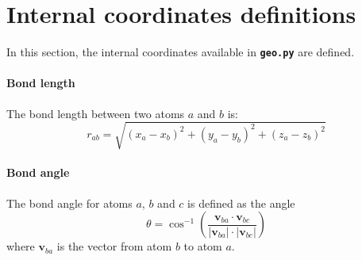 \documentclass[a4paper,11pt,DIV=15,openany,twoside=false]{scrbook}
\newcommand{\sharc}{\textsc{Sharc}}
\newcommand{\ttt}[1]{\textbf{\texttt{#1}}}
\newcommand{\VEC}[1]{\ensuremath{\mathbf{#1}}}
\begin{document}
% 
% 
% 


\section{Internal coordinates definitions}\label{met:geo}

In this section, the internal coordinates available in \ttt{geo.py} are defined.

\paragraph{Bond length}

The bond length between two atoms $a$ and $b$ is:
\begin{equation}
  r_{ab}=
  \sqrt{
    (x_a-x_b)^2+(y_a-y_b)^2+(z_a-z_b)^2
  }
\end{equation}

\paragraph{Bond angle}

The bond angle for atoms $a$, $b$ and $c$ is defined as the angle
\begin{equation}
  \theta=
  \cos^{-1}\left(
    \frac{\VEC{v}_{ba}\cdot\VEC{v}_{bc}}{|\VEC{v}_{ba}|\cdot|\VEC{v}_{bc}|}
  \right)\label{eq:angle}
\end{equation}
where $\VEC{v}_{ba}$ is the vector from atom $b$ to atom $a$.
\end{document}
